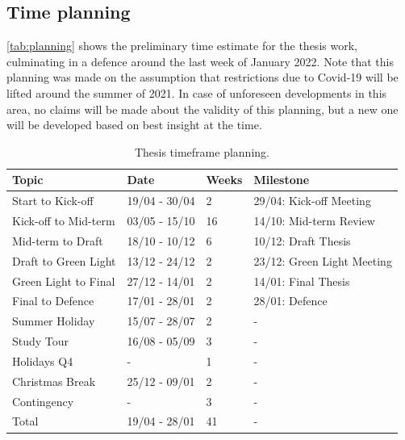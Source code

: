 \subsection{Time planning}
\autoref{tab:planning} shows the preliminary time estimate for the thesis work, culminating in a defence around the last week of January 2022. Note that this planning was made on the assumption that restrictions due to Covid-19 will be lifted around the summer of 2021. In case of unforeseen developments in this area, no claims will be made about the validity of this planning, but a new one will be developed based on best insight at the time.

\begin{table}[htbp]
\centering
\caption{Thesis timeframe planning.}
\label{tab:planning}
\begin{tabular}{llll}
\textbf{Topic}       & \textbf{Date} & \textbf{Weeks} & \textbf{Milestone}               \\ \hline \vspace{0.25cm}
Start to Kick-off    & 19/04 - 30/04 & 2              & 29/04: Kick-off Meeting           \\ \vspace{0.25cm}
Kick-off to Mid-term & 03/05 - 15/10 & 16             & 14/10: Mid-term Review            \\ \vspace{0.25cm}
Mid-term to Draft    & 18/10 - 10/12 & 6              & 10/12: Draft Thesis              \\ \vspace{0.25cm}
Draft to Green Light & 13/12 - 24/12 & 2              & 23/12: Green Light Meeting \\ \vspace{0.25cm}
Green Light to Final & 27/12 - 14/01 & 2              & 14/01: Final Thesis              \\ \vspace{0.25cm}
Final to Defence     & 17/01 - 28/01 & 2              & 28/01: Defence                   \\ \vspace{0.25cm}
Summer Holiday    & 15/07 - 28/07 & 2              & -                                \\ \vspace{0.25cm}
Study Tour       & 16/08 - 05/09 & 3              & -                                \\ \vspace{0.25cm}
Holidays Q4          & -             & 1              & -                                \\ \vspace{0.25cm}
Christmas Break      & 25/12 - 09/01 & 2              & -                                \\ \vspace{0.25cm}
Contingency          & -             & 3              & -                                \\ \hline \vspace{0.25cm}
Total                & 19/04 - 28/01 & 41             & -                               
\end{tabular}
\end{table}
\newpage

